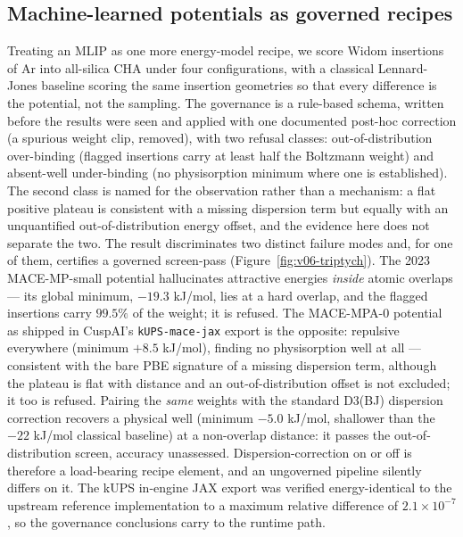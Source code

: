 \FloatBarrier

\subsection{Machine-learned potentials as governed recipes}\label{sec:v06-mlip}

Treating an MLIP as one more energy-model recipe, we score Widom insertions of Ar into all-silica CHA
under four configurations, with a classical Lennard-Jones baseline scoring the same insertion geometries
so that every difference is the potential, not the sampling. The governance is a rule-based schema,
written before the results were seen and applied with one documented post-hoc correction (a spurious
weight clip, removed),
with two refusal classes: out-of-distribution over-binding (flagged insertions carry at least half the
Boltzmann weight) and absent-well under-binding (no physisorption minimum where one is established).
The second class is named for the observation rather than a mechanism: a flat positive plateau is
consistent with a missing dispersion term but equally with an unquantified out-of-distribution energy
offset, and the evidence here does not separate the two. The result
discriminates two distinct failure modes and, for one of them, certifies a governed screen-pass (Figure~\ref{fig:v06-triptych}). The 2023
MACE-MP-small potential hallucinates attractive energies \emph{inside} atomic overlaps --- its global
minimum, \(-19.3\) kJ/mol, lies at a hard overlap, and the flagged insertions carry \(99.5\%\) of the
weight; it is refused. The MACE-MPA-0 potential as shipped in CuspAI's \texttt{kUPS-mace-jax} export is
the opposite: repulsive everywhere (minimum \(+8.5\) kJ/mol), finding no physisorption well at all ---
consistent with the bare PBE signature of a missing dispersion term, although the plateau is flat with
distance and an out-of-distribution offset is not excluded; it too is refused. Pairing the \emph{same} weights with
the standard D3(BJ) dispersion correction recovers a physical well (minimum \(-5.0\) kJ/mol, shallower than the
\(-22\) kJ/mol classical baseline) at a non-overlap distance: it passes the out-of-distribution screen, accuracy
unassessed. Dispersion-correction on or off is therefore
a load-bearing recipe element, and an ungoverned pipeline silently differs on it. The kUPS in-engine JAX
export was verified energy-identical to the upstream reference implementation to a maximum relative
difference of \(2.1\times10^{-7}\), so the governance conclusions carry to the runtime path.

